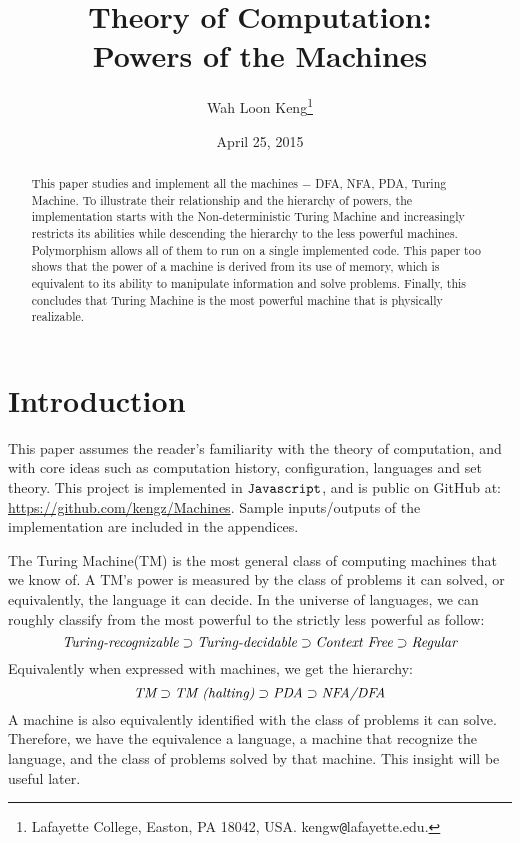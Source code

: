 \documentclass[12pt]{article}  %
\begin{document}
\title{Theory of Computation:\\ Powers of the Machines}

\author{
{Wah Loon Keng}\thanks{
Lafayette College,
Easton, PA 18042, USA.
kengw{\tt @}lafayette.edu.}
}
\date{April 25, 2015}
\maketitle

\begin{abstract}
This paper studies and implement all the machines $-$ DFA, NFA, PDA, Turing Machine. To illustrate their relationship and the hierarchy of powers, the implementation starts with the Non-deterministic Turing Machine and increasingly restricts its abilities while descending the hierarchy to the less powerful machines. Polymorphism allows all of them to run on a single implemented code. This paper too shows that the power of a machine is derived from its use of memory, which is equivalent to its ability to manipulate information and solve problems. Finally, this concludes that Turing Machine is the most powerful machine that is physically realizable.
\end{abstract}







\section{Introduction} \label{intro}


This paper assumes the reader's familiarity with the theory of computation, and with core ideas such as computation history, configuration, languages and set theory. This project is implemented in ${\tt Javascript}$, and is public on GitHub at: \url{https://github.com/kengz/Machines}. Sample inputs/outputs of the implementation are included in the appendices.

The Turing Machine(TM) is the most general class of computing machines that we know of. A TM's power is measured by the class of problems it can solved, or equivalently, the language it can decide. In the universe of languages, we can roughly classify from the most powerful to the strictly less powerful as follow:
$$\emph{Turing-recognizable} \supset \emph{Turing-decidable} \supset \emph{Context Free} \supset \emph{Regular}$$
Equivalently when expressed with machines, we get the hierarchy:
$$\emph{TM} \supset \emph{TM (halting)} \supset \emph{PDA} \supset \emph{NFA/DFA}$$
A machine is also equivalently identified with the class of problems it can solve. Therefore, we have the equivalence a language, a machine that recognize the language, and the class of problems solved by that machine. This insight will be useful later.
\end{document}
